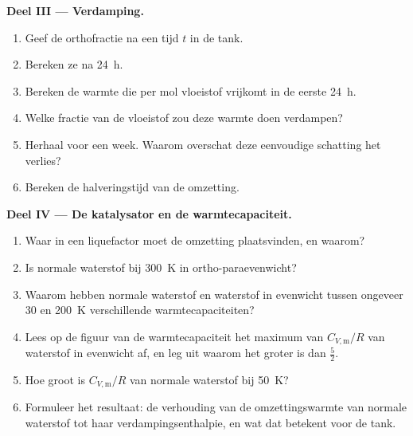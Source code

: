 \begin{problem}
\medskip\noindent\textbf{Deel III --- Verdamping.}
\begin{enumerate}[resume]
  \item Geef de orthofractie na een tijd $t$ in de tank.
  \item Bereken ze na \qty{24}{h}.
  \item Bereken de warmte die per mol vloeistof vrijkomt in de eerste
        \qty{24}{h}.
  \item Welke fractie van de vloeistof zou deze warmte doen verdampen?
  \item Herhaal voor een week. Waarom overschat deze eenvoudige schatting
        het verlies?
  \item Bereken de halveringstijd van de omzetting.
\end{enumerate}

\medskip\noindent\textbf{Deel IV --- De katalysator en de warmtecapaciteit.}
\begin{enumerate}[resume]
  \item Waar in een liquefactor moet de omzetting plaatsvinden, en waarom?
  \item Is normale waterstof bij \qty{300}{K} in ortho-paraevenwicht?
  \item Waarom hebben normale waterstof en waterstof in evenwicht tussen
        ongeveer 30 en \qty{200}{K} verschillende warmtecapaciteiten?
  \item Lees op de figuur van de warmtecapaciteit het maximum van
        $C_{V,\mathrm m}/R$ van waterstof in evenwicht af, en leg uit waarom
        het groter is dan $\frac52$.
  \item Hoe groot is $C_{V,\mathrm m}/R$ van normale waterstof bij \qty{50}{K}?
  \item Formuleer het resultaat: de verhouding van de omzettingswarmte van
        normale waterstof tot haar verdampingsenthalpie, en wat dat
        betekent voor de tank.
\end{enumerate}
\end{problem}
